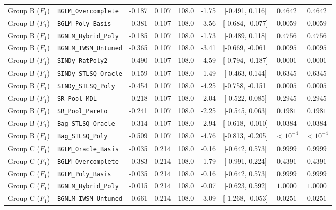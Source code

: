 \begin{table}[t]
\begin{tabular}{llccccccc}
Group B ($F_1$) & \texttt{BGLM\_Overcomplete} & -0.187 & 0.107 & 108.0 & -1.75 & [-0.491, 0.116] & $0.4642$ & $0.4642$ \\
Group B ($F_1$) & \texttt{BGLM\_Poly\_Basis} & -0.381 & 0.107 & 108.0 & -3.56 & [-0.684, -0.077] & $0.0059$ & $0.0059$ \\
Group B ($F_1$) & \texttt{BGNLM\_Hybrid\_Poly} & -0.185 & 0.107 & 108.0 & -1.73 & [-0.489, 0.118] & $0.4756$ & $0.4756$ \\
Group B ($F_1$) & \texttt{BGNLM\_IWSM\_Untuned} & -0.365 & 0.107 & 108.0 & -3.41 & [-0.669, -0.061] & $0.0095$ & $0.0095$ \\
Group B ($F_1$) & \texttt{SINDy\_RatPoly2} & -0.490 & 0.107 & 108.0 & -4.59 & [-0.794, -0.187] & $0.0001$ & $0.0001$ \\
Group B ($F_1$) & \texttt{SINDy\_STLSQ\_Oracle} & -0.159 & 0.107 & 108.0 & -1.49 & [-0.463, 0.144] & $0.6345$ & $0.6345$ \\
Group B ($F_1$) & \texttt{SINDy\_STLSQ\_Poly} & -0.454 & 0.107 & 108.0 & -4.25 & [-0.758, -0.151] & $0.0005$ & $0.0005$ \\
Group B ($F_1$) & \texttt{SR\_Pool\_MDL} & -0.218 & 0.107 & 108.0 & -2.04 & [-0.522, 0.085] & $0.2945$ & $0.2945$ \\
Group B ($F_1$) & \texttt{SR\_Pool\_Pareto} & -0.241 & 0.107 & 108.0 & -2.25 & [-0.545, 0.063] & $0.1981$ & $0.1981$ \\
Group B ($F_1$) & \texttt{Bag\_STLSQ\_Oracle} & -0.314 & 0.107 & 108.0 & -2.94 & [-0.618, -0.010] & $0.0384$ & $0.0384$ \\
Group B ($F_1$) & \texttt{Bag\_STLSQ\_Poly} & -0.509 & 0.107 & 108.0 & -4.76 & [-0.813, -0.205] & $< 10^{-4}$ & $< 10^{-4}$ \\
\midrule
Group C ($F_1$) & \texttt{BGLM\_Oracle\_Basis} & -0.035 & 0.214 & 108.0 & -0.16 & [-0.642, 0.573] & $0.9999$ & $0.9999$ \\
Group C ($F_1$) & \texttt{BGLM\_Overcomplete} & -0.383 & 0.214 & 108.0 & -1.79 & [-0.991, 0.224] & $0.4391$ & $0.4391$ \\
Group C ($F_1$) & \texttt{BGLM\_Poly\_Basis} & -0.035 & 0.214 & 108.0 & -0.16 & [-0.642, 0.573] & $0.9999$ & $0.9999$ \\
Group C ($F_1$) & \texttt{BGNLM\_Hybrid\_Poly} & -0.015 & 0.214 & 108.0 & -0.07 & [-0.623, 0.592] & $1.0000$ & $1.0000$ \\
Group C ($F_1$) & \texttt{BGNLM\_IWSM\_Untuned} & -0.661 & 0.214 & 108.0 & -3.09 & [-1.268, -0.053] & $0.0251$ & $0.0251$ \\

\end{tabular}
\end{table}
